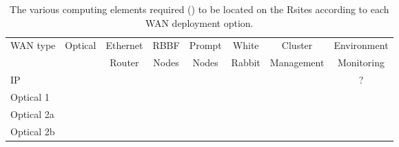 \newcommand{\cmy}{\checkmark}
\begin{table}[h!]
\centering
\begin{tabular}{l|ccccccc}
{WAN type} & {Optical} & {Ethernet} & {RBBF} & {Prompt} & {White} & {Cluster} & {Environment} \\
           &  & Router & Nodes & Nodes & Rabbit & Management & Monitoring \\ \hline
IP         & & \cmy & \cmy & \cmy & \cmy & \cmy & ? \\
Optical 1  & \cmy & \cmy & \cmy & & \cmy & \cmy & \\
Optical 2a & \cmy & \cmy & & & \cmy & & \\
Optical 2b & \cmy &   & & & \cmy & & \\
\end{tabular}
\caption{The various computing \einfra elements required (\cmy) to be located on the R\cmy sites according to each WAN deployment option.\label{tab:site-computing}}
\end{table}